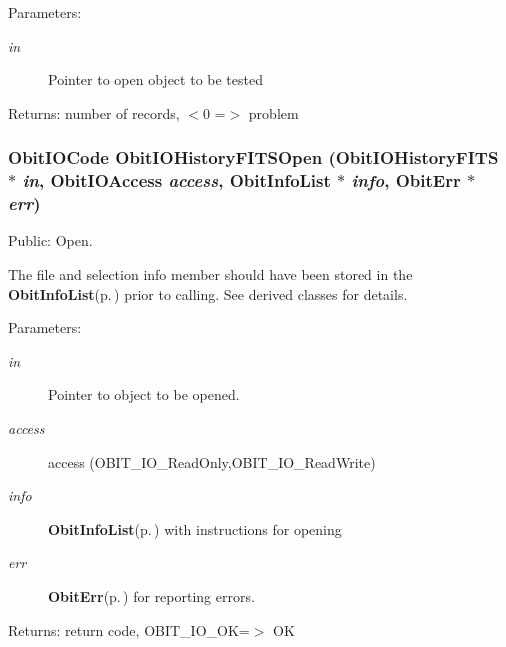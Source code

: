 \begin{Desc}
\item[Parameters:]
\begin{description}
\item[{\em in}]Pointer to open object to be tested \end{description}
\end{Desc}
\begin{Desc}
\item[Returns:]number of records, $<$0 =$>$ problem \end{Desc}
\subsubsection{\setlength{\rightskip}{0pt plus 5cm}Obit\-IOCode Obit\-IOHistory\-FITSOpen ({\bf Obit\-IOHistory\-FITS} $\ast$ {\em in}, Obit\-IOAccess {\em access}, {\bf Obit\-Info\-List} $\ast$ {\em info}, {\bf Obit\-Err} $\ast$ {\em err})}\label{ObitIOHistoryFITS_8h_a11}


Public: Open. 

The file and selection info member should have been stored in the {\bf Obit\-Info\-List}{\rm (p.\,\pageref{structObitInfoList})} prior to calling. See derived classes for details. \begin{Desc}
\item[Parameters:]
\begin{description}
\item[{\em in}]Pointer to object to be opened. \item[{\em access}]access (OBIT\_\-IO\_\-Read\-Only,OBIT\_\-IO\_\-Read\-Write) \item[{\em info}]{\bf Obit\-Info\-List}{\rm (p.\,\pageref{structObitInfoList})} with instructions for opening \item[{\em err}]{\bf Obit\-Err}{\rm (p.\,\pageref{structObitErr})} for reporting errors. \end{description}
\end{Desc}
\begin{Desc}
\item[Returns:]return code, OBIT\_\-IO\_\-OK=$>$ OK \end{Desc}
